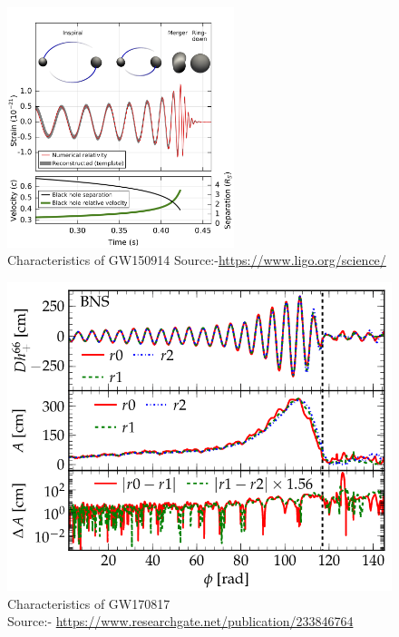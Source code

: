 \begin{figure}[h]
    \centering
    \includegraphics[height = 7cm, width = 8.2 cm]{images.tex/GW150914.png}
    \caption{Characteristics of GW150914   Source:-\url{https://www.ligo.org/science/}}
\end{figure}

\begin{figure}[h]
     \centering
     \includegraphics[scale = 0.31]{images.tex/GW170817.png}
     \caption{Characteristics of GW170817\\ Source:- \url{https://www.researchgate.net/publication/233846764}}
\end{figure}

\pagebreak
